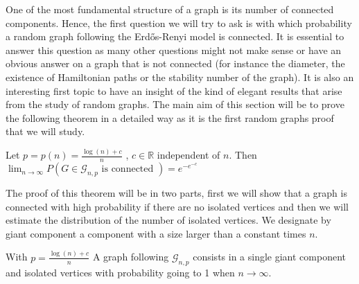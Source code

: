 One of the most fundamental structure of a graph is its number of connected components. 
Hence, the first question we will try to ask is with which probability a random graph following the Erd\H{o}s-Renyi model is connected. 
It is essential to answer this question as many other questions might not make sense or have an obvious answer on a graph that is not connected (for instance the diameter, the existence of Hamiltonian paths or the stability number of the graph). 
\newline
It is also an interesting first topic to have an insight of the kind of elegant results that arise from the study of random graphs.
The main aim of this section will be to prove the following theorem in a detailed way as it is the first random graphs proof that we will study.
\begin{theorem}\label{th:connect}
	Let $p = p(n) = \frac{\log(n) + c}{n}$ , $c \in \mathbb{R}$ independent of $n$.
\newline
Then $\lim_{n \to \infty} P(G \in \mathcal{G}_{n, p}\text{ is connected }) = e^{-e^{-c}}$ 
\end{theorem}
The proof of this theorem will be in two parts, first we will show that a graph is connected with high probability if there are no isolated vertices and then we will estimate the distribution of the number of isolated vertices.
We designate by giant component a component with a size larger than a constant times $n$.
\begin{theorem}\label{th:isolcomp}
	With $p = \frac{\log(n) + c}{n}$
	 A graph following $\mathcal{G}_{n, p}$ consists in a single giant component and isolated vertices with probability going to 1 when $n \to \infty$. 
\end{theorem}
